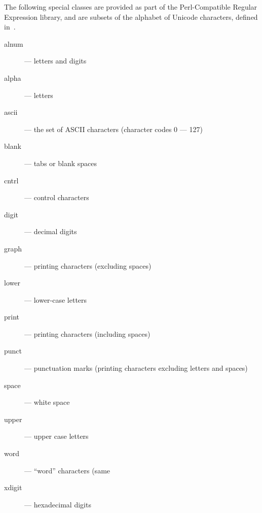 The following special classes are provided as part of the Perl-Compatible
Regular Expression library, and are subsets of the alphabet of Unicode
characters, defined in~\cite{php_group_gutmans_lerdorf_suraski_boerger}.

\begin{description}

\item[alnum] --- letters and digits

\item[alpha] --- letters

\item[ascii] --- the set of ASCII characters (character codes 0 --- 127)

\item[blank] --- tabs or blank spaces

\item[cntrl] --- control characters

\item[digit] --- decimal digits

\item[graph] --- printing characters (excluding spaces)

\item[lower] --- lower-case letters

\item[print] --- printing characters (including spaces)

\item[punct] --- punctuation marks (printing characters excluding letters and spaces)

\item[space] --- white space

\item[upper] --- upper case letters

\item[word] --- ``word'' characters (same

\item[xdigit] --- hexadecimal digits

\end{description}
